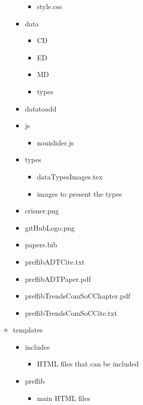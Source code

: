 \documentclass{report}
\begin{document}
\begin{figure}
\begin{multicols}{2}
\begin{itemize}
\begin{itemize}
\begin{itemize}
\begin{itemize}
							\item[\faFileO] style.css
						\end{itemize}
						\item[\faFolderO] data
						\begin{itemize}
							\item[\faFolderO] CD
							\item[\faFolderO] ED
							\item[\faFolderO] MD
							\item[\faFolderO] types
						\end{itemize}
						\item[\faFolderO] datatoadd
						\item[\faFolderO] js 
						\begin{itemize}
							\item[\faFileO] nouislider.js
						\end{itemize}
						\item[\faFolderO] types
						\begin{itemize}
							\item[\faFileO] dataTypesImages.tex
							\item[\faFilesO] images to present the types
						\end{itemize}
						\item[\faFileO] crisner.png
						\item[\faFileO] gitHubLogo.png
						\item[\faFileO] papers.bib
						\item[\faFileO] preflibADTCite.txt
						\item[\faFileO] preflibADTPaper.pdf
						\item[\faFileO] preflibTrendsComSoCChapter.pdf
						\item[\faFileO] preflibTrendsComSoCCite.txt
					\end{itemize}
					\item[\faFolderO] templates
					\begin{itemize}
						\item[\faFolderO] includes
						\begin{itemize}
							\item[\faFilesO] HTML files that can be included
						\end{itemize}
						\item[\faFolderO] preflib
						\begin{itemize}
							\item[\faFilesO] main HTML files
						\end{itemize}

\end{itemize}
\end{itemize}
\end{itemize}
\end{multicols}
\end{figure}
\end{document}
